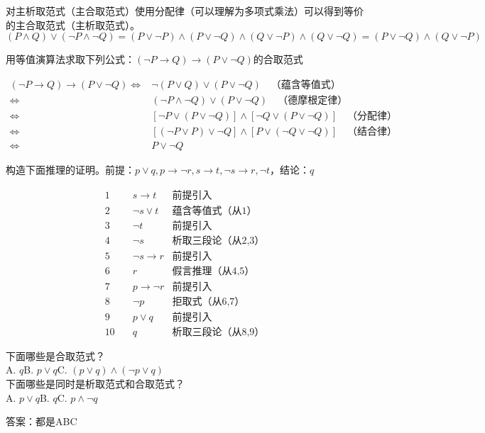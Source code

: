 \documentclass[lang=cn,11pt]{elegantbook}
\begin{document}
对主析取范式（主合取范式）使用分配律（可以理解为多项式乘法）可以得到等价的主合取范式（主析取范式）。
\[(P \land Q) \lor (\neg P \land \neg Q) = (P\lor \neg P)\land (P\lor \neg Q)\land (Q\lor \neg P)\land (Q\lor \neg Q)= (P\lor \neg Q)\land (Q\lor \neg P) \]
\begin{example}[2023年真题]
    用等值演算法求取下列公式：$(\neg P\to Q)\to(P\lor\neg Q)$的合取范式
\end{example}
\vspace{-30pt}
\begin{align*}
 (\neg P \to Q) \to (P \lor \neg Q) 
\Leftrightarrow &  \neg (P \lor Q) \lor (P \lor \neg Q) \quad \text{（蕴含等值式）} \\
\Leftrightarrow & (\neg P \land \neg Q) \lor (P \lor \neg Q) \quad \text{（德摩根定律）} \\
\Leftrightarrow & [\neg P \lor (P \lor \neg Q)] \land [\neg Q \lor (P \lor \neg Q)] \quad \text{（分配律）} \\
\Leftrightarrow & [(\neg P \lor P) \lor \neg Q] \land [P \lor (\neg Q \lor \neg Q)] \quad \text{（结合律）} \\
\Leftrightarrow & P \lor \neg Q 
\end{align*}
\begin{example}[2023年真题]
构造下面推理的证明。前提：$p\lor q, p\to \neg r, s\to t,\neg s\to r, \neg t$，结论：$q$
\end{example}
\vspace{-30pt}
\begin{align*}
1\quad& s\to t&\text{前提引入}\\
2\quad& \neg s\lor t&\text{蕴含等值式（从1）}\\
3\quad& \neg t&\text{前提引入}\\
4\quad& \neg s&\text{析取三段论（从2,3）}\\
5\quad& \neg s\to r&\text{前提引入}\\
6\quad& r&\text{假言推理（从4,5）}\\
7\quad& p\to \neg r&\text{前提引入}\\
8\quad& \neg p&\text{拒取式（从6,7）}\\
9\quad& p\lor q&\text{前提引入}\\
10\quad& q&\text{析取三段论（从8,9）}
\end{align*}
\begin{example}
    下面哪些是合取范式？\\
    A. $q$\quad B. $p\lor q$\quad C. $(p\lor q)\land(\neg p\lor q)$\\
    下面哪些是同时是析取范式和合取范式？\\
    A. $p\lor q$\quad B. $q$\quad C. $p\land \neg q$
\end{example}
答案：都是ABC
\end{document}
